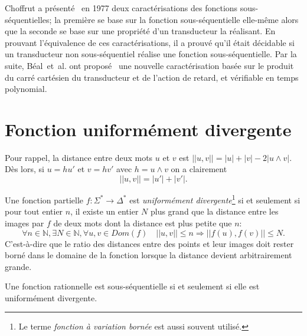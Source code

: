 \label{sequentiel}

Choffrut a présenté~\cite{Cho77} en 1977 deux caractérisations des fonctions sous-séquentielles; la première se base sur la fonction sous-séquentielle elle-même alors que la seconde se base sur une propriété d'un transducteur la réalisant. En prouvant l'équivalence de ces caractérisations, il a prouvé qu'il était décidable si un transducteur non sous-séquentiel réalise une fonction sous-séquentielle. Par la suite, Béal~et~al. ont proposé~\cite{Bea03} une nouvelle caractérisation basée sur le produit du carré cartésien du transducteur et de l'action de retard, et vérifiable en temps polynomial.
	
\section{Fonction uniformément divergente}

	Pour rappel, la distance entre deux mots $u$ et $v$ est $||u,v|| = |u| + |v| - 2|u\wedge v|$. Dès lors, si $u = hu'$ et $v = hv'$ avec $h = u\wedge v$ on a clairement 
	\begin{equation}
		\label{eq2}
		||u,v|| = |u'|+|v'| \text{.}
	\end{equation}
	
	\begin{definition}
		Une fonction partielle $f : \Sigma^* \to \Delta^*$ est \emph{uniformément divergente}\footnote{Le terme \emph{fonction à variation bornée} est aussi souvent utilisé.} si et seulement si pour tout entier $n$, il existe un entier $N$ plus grand que la distance entre les images par $f$ de deux mots dont la distance est plus petite que $n$:
		\begin{equation*}
		\forall n \in \mathbb{N}, \exists N \in \mathbb{N}, \forall u, v \in Dom(f) \quad ||u,v|| \leq n \Rightarrow ||f(u),f(v)|| \leq N.
		\end{equation*}
		C'est-à-dire que le ratio des distances entre des points et leur images doit rester borné dans le domaine de la fonction lorsque la distance devient arbitrairement grande. \\
	\end{definition}

	\begin{theorem}
		Une fonction rationnelle est sous-séquentielle si et seulement si elle est uniformément divergente. \\
	\end{theorem}
	
